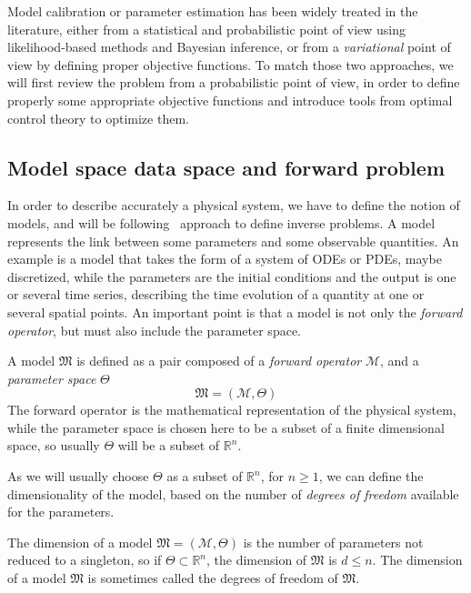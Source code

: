 \documentclass[../../Main_ManuscritThese.tex]{subfiles}
\begin{document}
Model calibration or parameter estimation has been widely treated in the literature, either from a statistical and probabilistic point of view using likelihood-based methods and Bayesian inference, or from a \emph{variational} point of view by defining proper objective functions. To match those two approaches, we will first review the problem from a probabilistic point of view, in order to define properly some appropriate objective functions and introduce tools from optimal control theory to optimize them.

 \subsection{Model space data space and forward problem}
\label{sec:model_space_data_space}
In order to describe accurately a physical system, we have to define the notion of models, and will be following~\cite{tarantola_inverse_2005} approach to define inverse problems.
 A model represents the link between some parameters and some observable quantities. An example is a model that takes the form of a system of ODEs or PDEs, maybe discretized, while the parameters are the initial conditions and the output is one or several time series, describing the time evolution of a quantity at one or several spatial points. An important point is that a model is not only the \emph{forward operator}, but must also include the parameter space.


 \begin{definition}[Model]
   \label{def:model}
  A model $\mathfrak{M}$ is defined as a pair composed of a \emph{forward operator} $\mathcal{M}$, and a \emph{parameter space} $\Theta$
  \begin{equation}
    \mathfrak{M} = (\mathcal{M}, \Theta)
  \end{equation}
The forward operator is the mathematical representation of the physical system, while the parameter space is chosen here to be a subset of a finite dimensional space, so usually $\Theta$ will be a subset of $\mathbb{R}^n$.
\end{definition}
As we will usually choose $\Theta$ as a subset of $\mathbb{R}^n$, for $n\geq 1$, we can define the dimensionality of the model, based on the number of \emph{degrees of freedom} available for the parameters.


\begin{remark}
  \label{rmk:model_dimension}
  The dimension of a model $\mathfrak{M}=(\mathcal{M},\Theta)$ is the number of parameters not reduced to a singleton, so if $\Theta \subset \mathbb{R}^n$, the dimension of $\mathfrak{M}$ is $d \leq n$. The dimension of a model $\mathfrak{M}$ is sometimes called the degrees of freedom of $\mathfrak{M}$.
  \end{remark}
\end{document}
